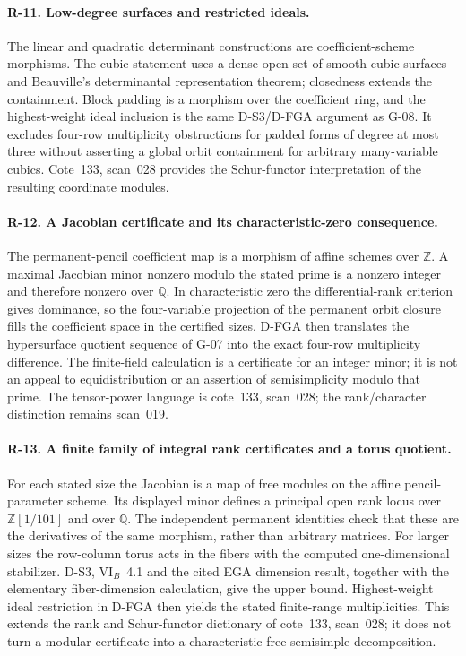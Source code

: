 \paragraph{R-11. Low-degree surfaces and restricted ideals.}
The linear and quadratic determinant constructions are coefficient-scheme morphisms. The cubic statement uses a dense open set of smooth cubic surfaces and Beauville's determinantal representation theorem; closedness extends the containment. Block padding is a morphism over the coefficient ring, and the highest-weight ideal inclusion is the same D-S3/D-FGA argument as G-08. It excludes four-row multiplicity obstructions for padded forms of degree at most three without asserting a global orbit containment for arbitrary many-variable cubics. Cote~133, scan~028 provides the Schur-functor interpretation of the resulting coordinate modules.

\paragraph{R-12. A Jacobian certificate and its characteristic-zero consequence.}
The permanent-pencil coefficient map is a morphism of affine schemes over $\mathbb Z$. A maximal Jacobian minor nonzero modulo the stated prime is a nonzero integer and therefore nonzero over $\mathbb Q$. In characteristic zero the differential-rank criterion gives dominance, so the four-variable projection of the permanent orbit closure fills the coefficient space in the certified sizes. D-FGA then translates the hypersurface quotient sequence of G-07 into the exact four-row multiplicity difference. The finite-field calculation is a certificate for an integer minor; it is not an appeal to equidistribution or an assertion of semisimplicity modulo that prime. The tensor-power language is cote~133, scan~028; the rank/character distinction remains scan~019.


\paragraph{R-13. A finite family of integral rank certificates and a torus quotient.}
For each stated size the Jacobian is a map of free modules on the affine pencil-parameter scheme. Its displayed minor defines a principal open rank locus over $\mathbb Z[1/101]$ and over $\mathbb Q$. The independent permanent identities check that these are the derivatives of the same morphism, rather than arbitrary matrices. For larger sizes the row-column torus acts in the fibers with the computed one-dimensional stabilizer. D-S3, VI$_B$~4.1 and the cited EGA dimension result, together with the elementary fiber-dimension calculation, give the upper bound. Highest-weight ideal restriction in D-FGA then yields the stated finite-range multiplicities. This extends the rank and Schur-functor dictionary of cote~133, scan~028; it does not turn a modular certificate into a characteristic-free semisimple decomposition.

